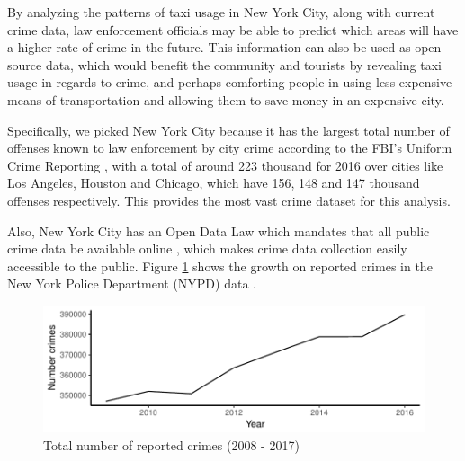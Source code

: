 \documentclass{sigkddExp}
\begin{document}
By analyzing the patterns of taxi usage in New York City, along with current crime data, law enforcement officials may be able to predict which areas will have a higher rate of crime in the future. This information can also be used as open source data, which would benefit the community and tourists by revealing taxi usage in regards to crime, and perhaps comforting people in using less expensive means of transportation and allowing them to save money in an expensive city.  

Specifically, we picked New York City because it has the largest  total number of offenses known to law enforcement by city crime according to the FBI's Uniform Crime Reporting \cite{fbiUniformCrime}, with a total of around 223 thousand for 2016 over cities like Los Angeles, Houston and Chicago, which have 156, 148 and
147 thousand offenses respectively. 
This provides the most vast crime dataset for this analysis.

Also, New York City has an Open Data Law which mandates that all public crime data be available online \cite{OpenDat}, which makes crime data collection easily accessible to the public. Figure \ref{total_crimes} shows the growth on reported crimes in the New York Police Department (NYPD) data \cite{NYPDHis}.

\begin{figure}
\caption{Total number of reported crimes (2008 - 2017)}
\label{total_crimes}
\centering \includegraphics[width=.45\textwidth]{../img/total_crimes.pdf}
\end{figure}





\end{document}
